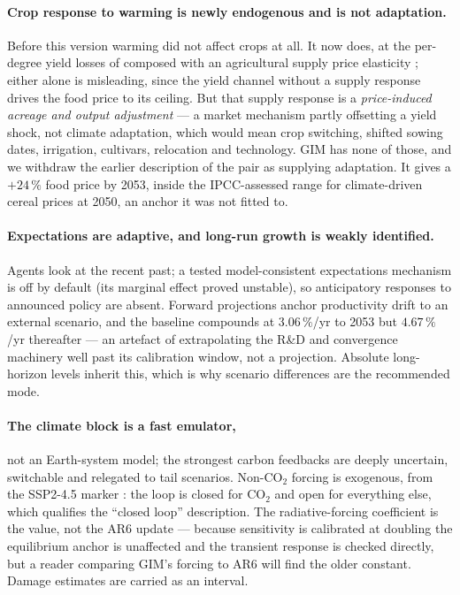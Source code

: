 \documentclass[12pt,a4paper]{article}
\begin{document}
\paragraph{Crop response to warming is newly endogenous and is not adaptation.} Before this
version warming did not affect crops at all. It now does, at the per-degree yield losses of
\citet{zhao2017} composed with an agricultural supply price elasticity \citep{haile2016};
either alone is misleading, since the yield channel without a supply response drives the food
price to its ceiling. But that supply response is a \emph{price-induced acreage and output
adjustment} --- a market mechanism partly offsetting a yield shock, not climate adaptation,
which would mean crop switching, shifted sowing dates, irrigation, cultivars, relocation and
technology. GIM has none of those, and we withdraw the earlier description of the pair as
supplying adaptation. It gives a $+24\,\%$ food price by 2053, inside the IPCC-assessed range
for climate-driven cereal prices at 2050, an anchor it was not fitted to.

\paragraph{Expectations are adaptive, and long-run growth is weakly identified.} Agents look at
the recent past; a tested model-consistent expectations mechanism is off by default (its
marginal effect proved unstable), so anticipatory responses to announced policy are absent.
Forward projections anchor productivity drift to an external scenario, and the baseline
compounds at $3.06\,\%$/yr to 2053 but $4.67\,\%$/yr thereafter --- an artefact of
extrapolating the R\&D and convergence machinery well past its calibration window, not a
projection. Absolute long-horizon levels inherit this, which is why scenario differences are
the recommended mode.

\paragraph{The climate block is a fast emulator,} not an Earth-system model; the strongest
carbon feedbacks are deeply uncertain, switchable and relegated to tail scenarios. Non-CO$_2$
forcing is exogenous, from the SSP2-4.5 marker \citep{meinshausen2020}: the loop is closed for
CO$_2$ and open for everything else, which qualifies the ``closed loop'' description. The
radiative-forcing coefficient is the \citet{myhre1998} value, not the AR6 update
\citep{forster2021} --- because sensitivity is calibrated at doubling the equilibrium anchor is
unaffected and the transient response is checked directly, but a reader comparing GIM's forcing
to AR6 will find the older constant. Damage estimates are carried as an interval.
\end{document}
